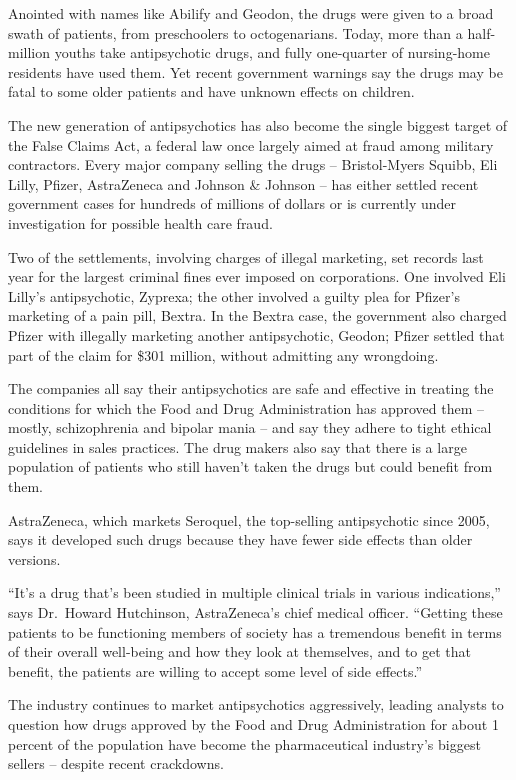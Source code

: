﻿\documentclass[12pt]{article}
\begin{document}
Anointed with names like Abilify and Geodon, the drugs were given to a broad swath of patients, from
preschoolers to octogenarians. Today, more than a half-million youths take antipsychotic drugs, and
fully one-quarter of nursing-home residents have used them. Yet recent government warnings say the
drugs may be fatal to some older patients and have unknown effects on children.

The new generation of antipsychotics has also become the single biggest target of the False Claims
Act, a federal law once largely aimed at fraud among military contractors. Every major company
selling the drugs -- Bristol-Myers Squibb, Eli Lilly, Pfizer, AstraZeneca and Johnson \& Johnson --
has either settled recent government cases for hundreds of millions of dollars or is currently under
investigation for possible health care fraud.

Two of the settlements, involving charges of illegal marketing, set records last year for the
largest criminal fines ever imposed on corporations. One involved Eli Lilly's antipsychotic,
Zyprexa; the other involved a guilty plea for Pfizer's marketing of a pain pill, Bextra. In the
Bextra case, the government also charged Pfizer with illegally marketing another antipsychotic,
Geodon; Pfizer settled that part of the claim for \$301 million, without admitting any wrongdoing.

The companies all say their antipsychotics are safe and effective in treating the conditions for
which the Food and Drug Administration has approved them -- mostly, schizophrenia and bipolar mania
-- and say they adhere to tight ethical guidelines in sales practices. The drug makers also say that
there is a large population of patients who still haven't taken the drugs but could benefit from
them.

AstraZeneca, which markets Seroquel, the top-selling antipsychotic since 2005, says it developed
such drugs because they have fewer side effects than older versions.

``It's a drug that's been studied in multiple clinical trials in various indications,'' says
Dr.~Howard Hutchinson, AstraZeneca's chief medical officer. ``Getting these patients to be
functioning members of society has a tremendous benefit in terms of their overall well-being and how
they look at themselves, and to get that benefit, the patients are willing to accept some level of
side effects.''

The industry continues to market antipsychotics aggressively, leading analysts to question how drugs
approved by the Food and Drug Administration for about 1 percent of the population have become the
pharmaceutical industry's biggest sellers -- despite recent crackdowns.
\end{document}
